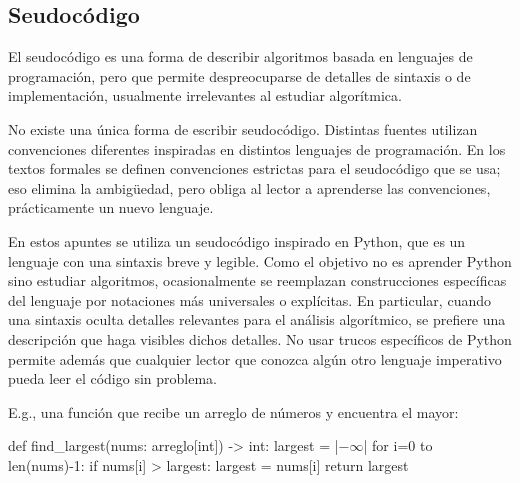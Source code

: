 \subsection{Seudocódigo}

El seudocódigo es una forma de describir algoritmos basada en lenguajes de programación, pero que permite despreocuparse de detalles de sintaxis o de implementación, usualmente irrelevantes al estudiar algorítmica.

No existe una única forma de escribir seudocódigo. Distintas fuentes utilizan convenciones diferentes inspiradas en distintos lenguajes de programación. En los textos formales se definen convenciones estrictas para el seudocódigo que se usa; eso elimina la ambigüedad, pero obliga al lector a aprenderse las convenciones, prácticamente un nuevo lenguaje. 

En estos apuntes se utiliza un seudocódigo inspirado en Python, que es un lenguaje con una sintaxis breve y legible. Como el objetivo no es aprender Python sino estudiar algoritmos, ocasionalmente se reemplazan construcciones específicas del lenguaje por notaciones más universales o explícitas. En particular, cuando una sintaxis oculta detalles relevantes para el análisis algorítmico, se prefiere una descripción que haga visibles dichos detalles. No usar trucos específicos de Python permite además que cualquier lector que conozca algún otro lenguaje imperativo pueda leer el código sin problema.

E.g., una función que recibe un arreglo de números y encuentra el mayor:
\begin{pseudocode}
def find_largest(nums: arreglo[int]) -> int:
    largest = |\(-\infty\)|
    for i=0 to len(nums)-1:
        if nums[i] > largest:
            largest = nums[i]
    return largest
\end{pseudocode}

